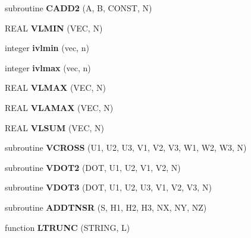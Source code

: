 \begin{CompactItemize}
\item 
\hypertarget{mat1_8F_be2ea0049b77ba883b1e2c24717be632}{
subroutine \textbf{CADD2} (A, B, CONST, N)}
\label{mat1_8F_be2ea0049b77ba883b1e2c24717be632}

\item 
\hypertarget{mat1_8F_f9c67ebba511e08ad51f1eecc2254e33}{
REAL \textbf{VLMIN} (VEC, N)}
\label{mat1_8F_f9c67ebba511e08ad51f1eecc2254e33}

\item 
\hypertarget{mat1_8F_cc19ea9fcec8b2ed453355a2290d9eef}{
integer \textbf{ivlmin} (vec, n)}
\label{mat1_8F_cc19ea9fcec8b2ed453355a2290d9eef}

\item 
\hypertarget{mat1_8F_8b2fe4c378ac8d5b18010058bbc7d0d8}{
integer \textbf{ivlmax} (vec, n)}
\label{mat1_8F_8b2fe4c378ac8d5b18010058bbc7d0d8}

\item 
\hypertarget{mat1_8F_0ebd38887795323bf31e7b805234f286}{
REAL \textbf{VLMAX} (VEC, N)}
\label{mat1_8F_0ebd38887795323bf31e7b805234f286}

\item 
\hypertarget{mat1_8F_f8e7e4d5f2ba714bf6c75552ec7d5c91}{
REAL \textbf{VLAMAX} (VEC, N)}
\label{mat1_8F_f8e7e4d5f2ba714bf6c75552ec7d5c91}

\item 
\hypertarget{mat1_8F_9fb2e9f84c872f7798c9d88a0407302f}{
REAL \textbf{VLSUM} (VEC, N)}
\label{mat1_8F_9fb2e9f84c872f7798c9d88a0407302f}

\item 
\hypertarget{mat1_8F_77a5f271a080360bc875d2ab9a738bb3}{
subroutine \textbf{VCROSS} (U1, U2, U3, V1, V2, V3, W1, W2, W3, N)}
\label{mat1_8F_77a5f271a080360bc875d2ab9a738bb3}

\item 
\hypertarget{mat1_8F_8dbbf06aff0fd996918b582fd31fe065}{
subroutine \textbf{VDOT2} (DOT, U1, U2, V1, V2, N)}
\label{mat1_8F_8dbbf06aff0fd996918b582fd31fe065}

\item 
\hypertarget{mat1_8F_0475abc0d0a7f19786ca5010747e7c22}{
subroutine \textbf{VDOT3} (DOT, U1, U2, U3, V1, V2, V3, N)}
\label{mat1_8F_0475abc0d0a7f19786ca5010747e7c22}

\item 
\hypertarget{mat1_8F_cfb7739cf11c4307458544b57bdf861e}{
subroutine \textbf{ADDTNSR} (S, H1, H2, H3, NX, NY, NZ)}
\label{mat1_8F_cfb7739cf11c4307458544b57bdf861e}

\item 
\hypertarget{mat1_8F_0da0e51bd4266a97c955283184e9ac47}{
function \textbf{LTRUNC} (STRING, L)}
\label{mat1_8F_0da0e51bd4266a97c955283184e9ac47}


\end{CompactItemize}
